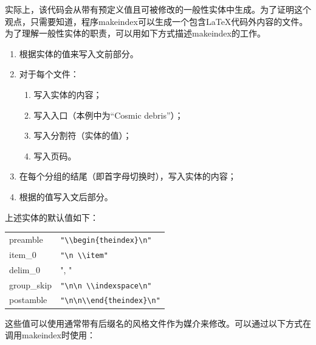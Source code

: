 实际上，该代码会从带有预定义值且可被修改的一般性实体中生成。为了证明这个观点，只需要知道，程序\textsf{makeindex}可以生成一个包含\LaTeX 代码外内容的文件。为了理解一般性实体的职责，可以用如下方式描述\textsf{makeindex}的工作。

\begin{enumerate}
    \item 根据实体的值来写入文前部分。
    \item 对于每个文件：
    \begin{enumerate}
        \item 写入实体的内容；
        \item 写入入口（本例中为“Cosmic debris”）；
        \item 写入分割符（实体的值）；
        \item 写入页码。
    \end{enumerate}
    \item 在每个分组的结尾（即首字母切换时），写入实体的内容；
    \item 根据的值写入文后部分。
\end{enumerate}

上述实体的默认值如下：

\begin{center}
    \begin{dmd}
        \begin{tabular}{|l|l|}
            \hline
            preamble & \verb+"\\begin{theindex}\n"+\\
            item\_0 &\verb+"\n \\item"+\\
            delim\_0 & ", "\\
            group\_skip & \verb+"\n\n \\indexspace\n"+\\
            postamble & \verb+"\n\n\\end{theindex}\n"+\\
            \hline
        \end{tabular}
    \end{dmd}
\end{center}

这些值可以使用通常带有后缀名的风格文件作为媒介来修改。可以通过以下方式在调用\textsf{makeindex}时使用：


